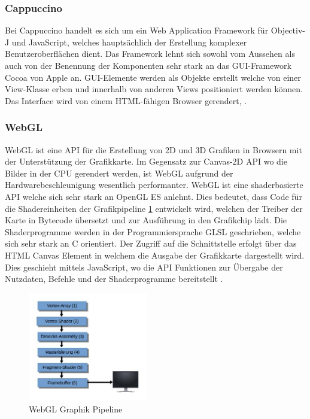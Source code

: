 \subsubsection{Cappuccino}
\label{sec:Cappuccino}
Bei Cappuccino handelt es sich um ein Web Application Framework für Objectiv-J und JavaScript, welches hauptsächlich der Erstellung komplexer Benutzeroberflächen dient.
Das Framework lehnt sich sowohl vom Aussehen als auch von der Benennung der Komponenten sehr stark an das GUI-Framework Cocoa von Apple an.
GUI-Elemente werden als Objekte erstellt welche von einer View-Klasse erben und innerhalb von anderen Views positioniert werden können.
Das Interface wird von einem HTML-fähigen Browser gerendert, 
\cite{capp}.


\subsubsection{WebGL}
\label{sec:WebGL}
WebGL ist eine API für die Erstellung von 2D und 3D Grafiken in Browsern mit der Unterstützung der Grafikkarte.
Im Gegensatz zur Canvas-2D API wo die Bilder in der CPU gerendert werden, ist WebGL aufgrund der Hardwarebeschleunigung wesentlich performanter.
WebGL ist eine shaderbasierte API welche sich sehr stark an OpenGL ES anlehnt.
Dies bedeutet, dass Code für die Shadereinheiten der Grafikpipeline \ref{fig:webgl_graphics_pipeline} entwickelt wird,
welchen der Treiber der Karte in Bytecode übersetzt und zur Ausführung in den Grafikchip lädt.
Die Shaderprogramme werden in der Programmiersprache GLSL geschrieben, welche sich sehr stark an C orientiert.
Der Zugriff auf die Schnittstelle erfolgt über das HTML Canvas Element in welchem die Ausgabe der Grafikkarte dargestellt wird.
Dies geschieht mittels JavaScript, wo die API Funktionen zur Übergabe der Nutzdaten, Befehle und der Shaderprogramme bereitstellt \cite{webgl-14}.
\begin{figure}[t]
	\centering
	\includegraphics[width=5.2cm]{img/graphics_pipeline.jpg}
	\caption{WebGL Graphik Pipeline}
	\label{fig:webgl_graphics_pipeline}
\end{figure}

